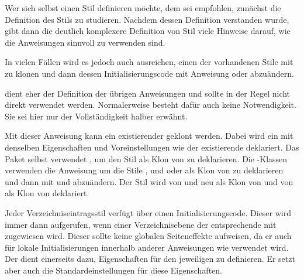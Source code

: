Wer sich selbst einen Stil definieren möchte, dem sei
empfohlen, zunächst die Definition des Stils  zu
studieren. Nachdem dessen Definition verstanden wurde, gibt dann die deutlich
komplexere Definition von Stil  viele Hinweise darauf, wie die
Anweisungen sinnvoll zu verwenden sind.

In vielen Fällen wird es jedoch auch ausreichen, einen der
vorhandenen Stile mit  zu klonen
und dann dessen Initialisierungscode mit Anweisung
 oder
 abzuändern.

 dient eher der Definition der übrigen
Anweisungen und sollte in der Regel nicht direkt verwendet
werden. Normalerweise besteht dafür auch keine Notwendigkeit. Sie sei hier
nur der Vollständigkeit halber erwähnt.%
\EndIndexGroup


\begin{Declaration}
\end{Declaration}
Mit dieser Anweisung kann ein
existierender  geklont werden. Dabei wird ein 
mit denselben Eigenschaften und Voreinstellungen wie der existierende
 deklariert. Das Paket selbst verwendet
, um den Stil  als Klon von
 zu deklarieren. Die \KOMAScript-Klassen verwenden die
Anweisung um die Stile ,  und 
oder  als Klon von  zu deklarieren und dann
mit  und
 abzuändern. Der Stil
 wird von  und  neu als Klon
von  und von  als Klon von 
deklariert.%
\EndIndexGroup


\begin{Declaration}
\end{Declaration}
Jeder Verzeichniseintragsstil
verfügt über einen Initialisierungscode. Dieser wird immer dann aufgerufen,
wenn einer Verzeichnisebene der entsprechende  mit
zugewiesen wird. Dieser  sollte
keine globalen Seiteneffekte aufweisen, da er auch für lokale
Initialisierungen innerhalb anderer Anweisungen wie
 verwendet
wird. Der  dient einerseits dazu, Eigenschaften
für den jeweiligen  zu definieren. Er setzt aber auch die
Standardeinstellungen für diese Eigenschaften.

